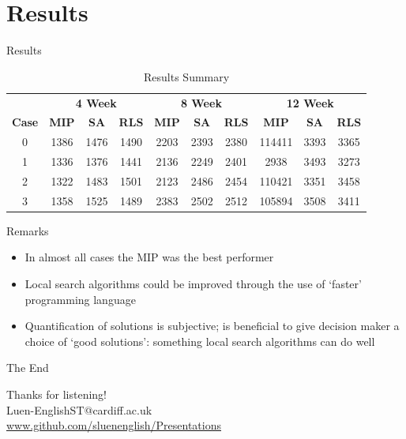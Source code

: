 \documentclass{beamer}
\begin{document}
\section{Results}
\begin{frame}{Results}
    \begin{table}[H]
        \centering
        \caption{Results Summary}
        \label{fig:results}
        \begin{tabular}{cccccccccc}
            \toprule
            & \multicolumn{3}{c}{\textbf{4 Week}} & \multicolumn{3}{c}{\textbf{8 Week}} & \multicolumn{3}{c}{\textbf{12 Week}} \\
            \cmidrule(lr){2-4}\cmidrule(lr){5-7}\cmidrule(lr){8-10}
            \textbf{Case}      & \textbf{MIP}       & \textbf{SA}       & \textbf{RLS}      & \textbf{MIP}           & \textbf{SA}           & \textbf{RLS}          & \textbf{MIP}           & \textbf{SA}           & \textbf{RLS}          \\
            \cmidrule(lr){1-1}\cmidrule(lr){2-4}\cmidrule(lr){5-7}\cmidrule(lr){8-10}
            0         & 1386      & 1476     & 1490     & 2203          & 2393         & 2380         & 114411        & 3393         & 3365         \\
            1         & 1336      & 1376     & 1441     & 2136          & 2249         & 2401         & 2938          & 3493         & 3273         \\
            2         & 1322      & 1483     & 1501     & 2123          & 2486         & 2454         & 110421        & 3351         & 3458        \\
            3         & 1358      & 1525     & 1489     & 2383          & 2502         & 2512         & 105894        & 3508         & 3411         \\ \bottomrule
        \end{tabular}
    \end{table}
\end{frame}

\begin{frame}{Remarks}
    \begin{itemize}
        \item In almost all cases the MIP was the best performer
        \item Local search algorithms could be improved through the use of `faster' programming language
        \item Quantification of solutions is subjective; is beneficial to give decision maker a choice of `good solutions': something local search algorithms can do well
    \end{itemize}
\end{frame}


\begin{frame}{The End}
    \begin{center}
        Thanks for listening! \\
        \vspace{12pt}
        Luen-EnglishST@cardiff.ac.uk\\
        \url{www.github.com/sluenenglish/Presentations}
    \end{center}
\end{frame}
\end{document}
